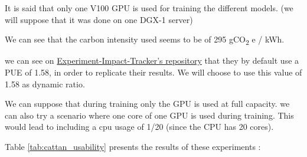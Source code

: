 \documentclass[11pt]{article}
\begin{document}
It is said that only one V100 GPU is used for training the different
models. (we will suppose that it was done on one DGX-1 server)

We can see that the carbon intensity used seems to be of 295 gCO\textsubscript{2} e /
kWh.

we can see on \href{https://github.com/Breakend/experiment-impact-tracker}{Experiment-Impact-Tracker's repository} that they by default use a \gls{PUE}
of 1.58, in order to replicate their results. We will choose to use
this value of 1.58 as dynamic ratio.

We can suppose that during training only the GPU is used at full
capacity. we can also try a scenario where one core of one GPU is used
during training. This would lead to including a cpu usage of 1/20
(since the CPU has 20 cores).

Table \ref{tab:cattan_usability} presents the results of these
experiments :
\end{document}
